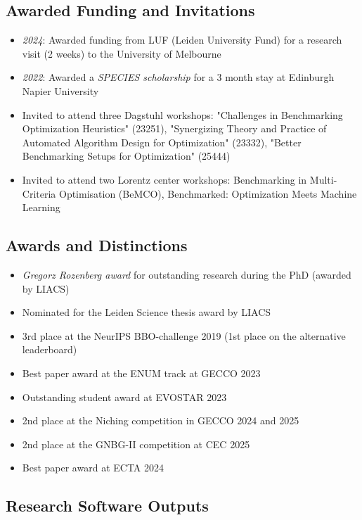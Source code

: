 
\subsection*{Awarded Funding and Invitations}
\begin{itemize}
    \item[] \textit{2024}: Awarded funding from LUF (Leiden University Fund) for a research visit (2 weeks) to the University of Melbourne
    \item[] \textit{2022}: Awarded a \emph{SPECIES scholarship} for a 3 month stay at Edinburgh Napier University
    \item[] Invited to attend three Dagstuhl workshops: "Challenges in Benchmarking Optimization Heuristics" (23251), "Synergizing Theory and Practice of Automated Algorithm Design for Optimization" (23332), "Better Benchmarking Setups for Optimization" (25444)
    \item[] Invited to attend two Lorentz center workshops: Benchmarking in Multi-Criteria Optimisation (BeMCO), Benchmarked: Optimization Meets Machine Learning
\end{itemize}

\subsection*{Awards and Distinctions}
\begin{itemize}
    \item[] \emph{Gregorz Rozenberg award} for outstanding research during the PhD (awarded by LIACS)
    \item[] Nominated for the Leiden Science thesis award by LIACS
    \item[] 3rd place at the NeurIPS BBO-challenge 2019 (1st place on the alternative leaderboard)
    \item[] Best paper award at the ENUM track at GECCO 2023 
    \item[] Outstanding student award at EVOSTAR 2023
    \item[] 2nd place at the Niching competition in GECCO 2024 and 2025
    \item[] 2nd place at the GNBG-II competition at CEC 2025
    \item[] Best paper award at ECTA 2024 
\end{itemize}

\subsection*{Research Software Outputs}

